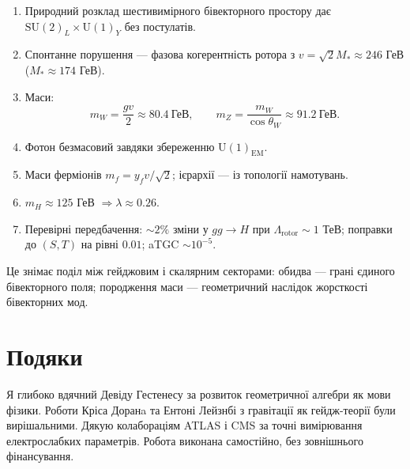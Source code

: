 \documentclass[11pt,a4paper]{article}
\newcommand{\SU}{\mathrm{SU}}
\newcommand{\UU}{\mathrm{U}}
\theoremstyle{definition}
\theoremstyle{plain}
\theoremstyle{remark}
\begin{document}
\begin{enumerate}[leftmargin=*,itemsep=3pt]
  \item Природний розклад шестивимірного бівекторного простору дає $\SU(2)_L \times \UU(1)_Y$ без постулатів.
  \item Спонтанне порушення — фазова когерентність ротора з $v=\sqrt{2}M_\ast\approx 246$ ГеВ ($M_\ast\approx 174$ ГеВ).
  \item Маси:
  \[
  m_W = \frac{gv}{2} \approx 80{.}4~\text{ГеВ},\qquad
  m_Z = \frac{m_W}{\cos\theta_W} \approx 91{.}2~\text{ГеВ}.
  \]
  \item Фотон безмасовий завдяки збереженню $\UU(1)_{\text{EM}}$.
  \item Маси ферміонів $m_f = y_f v/\sqrt{2}$; ієрархії — із топології намотувань.
  \item $m_H \approx 125$ ГеВ $\Rightarrow \lambda \approx 0{.}26$.
  \item Перевірні передбачення: $\sim2\%$ зміни у $gg\to H$ при $\Lambda_{\text{rotor}}\sim 1$ ТеВ; поправки до $(S,T)$ на рівні $0{.}01$; aTGC $\sim 10^{-5}$.
\end{enumerate}

Це знімає поділ між гейджовим і скалярним секторами: обидва — грані єдиного бівекторного поля; породження маси — геометричний наслідок жорсткості бівекторних мод.

\vspace{1em}

\section*{Подяки}

Я глибоко вдячний Девіду Гестенесу за розвиток геометричної алгебри як мови фізики. Роботи Кріса Доранa та Ентоні Лейзнбі з гравітації як гейдж-теорії були вирішальними. Дякую колабораціям ATLAS і CMS за точні вимірювання електрослабких параметрів. Робота виконана самостійно, без зовнішнього фінансування.

\vspace{1em}
\end{document}
